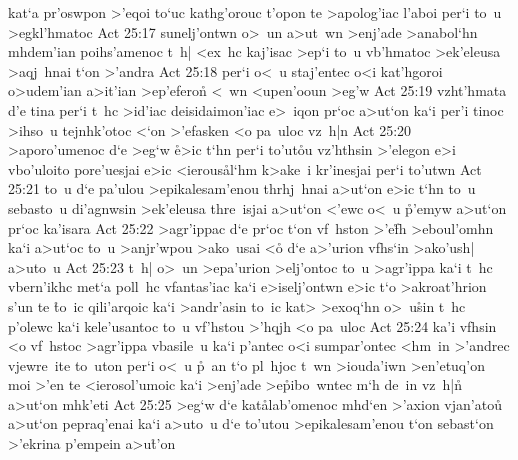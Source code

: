 kat`a
pr'oswpon
>'eqoi
to`uc
kathg'orouc
t'opon
te
>apolog'iac
l'aboi
per`i
to~u
>egkl'hmatoc\bibvsend
\vs Act 25:17
sunelj'ontwn
o>~un
a>ut~wn
>enj'ade
>anabol`hn
mhdem'ian
poihs'amenoc
t~h|
<ex~hc
kaj'isac
>ep`i
to~u
vb'hmatoc
>ek'eleusa
>aqj~hnai
t`on
>'andra\bibvsend
\vs Act 25:18
per`i
o<~u
staj'entec
o<i
kat'hgoroi
o>udem'ian
a>it'ian
>ep'eferon\r{}
<~wn
<upen'ooun
>eg'w\bibvsend
\vs Act 25:19
vzht'hmata
d'e
tina
per`i
t~hc
>id'iac
deisidaimon'iac
e>~iqon
pr`oc
a>ut`on
ka`i
per'i
tinoc
>ihso~u
tejnhk'otoc
<`on
>'efasken
<o
pa~uloc
vz~h|n\bibvsend
\vs Act 25:20
>aporo'umenoc
d`e
>eg`w
\r{e}>ic
t`hn
per`i
to'ut\r{o}u
vz'hthsin
>'elegon
e>i
vbo'uloito
pore'uesjai
e>ic
<ierous\r{a}l`hm
k>ake~i
kr'inesjai
per`i
to'utwn\bibvsend
\vs Act 25:21
to~u
d`e
pa'ulou
>epikalesam'enou
thrhj~hnai
a>ut`on
e>ic
t`hn
to~u
sebasto~u
di'agnwsin
>ek'eleusa
thre~isjai
a>ut`on
<'ewc
o<~u
\r{p}'emyw
a>ut`on
pr`oc
ka'isara\bibvsend
\vs Act 25:22
>agr'ippac
d`e
pr`oc
t`on
vf~hston
>'e\r{f}h
>eboul'omhn
ka`i
a>ut`oc
to~u
>anjr'wpou
>ako~usai
<o\r{}
d`e
a>'urion
vfhs`in
>ako'ush|
a>uto~u\bibvsend
\vs Act 25:23
t~h|
o>~un
>epa'urion
>elj'ontoc
to~u
>agr'ippa
ka`i
t~hc
vbern'ikhc
met`a
poll~hc
vfantas'iac
ka`i
e>iselj'ontwn
e>ic
t`o
>akroat'hrion
s'un
te
\r{t}o~ic
qili'arqoic
ka`i
>andr'asin
to~ic
kat>
>exoq`hn
o>~u\r{s}in
t~hc
p'olewc
ka`i
kele'usantoc
to~u
vf'hstou
>'hqjh
<o
pa~uloc\bibvsend
\vs Act 25:24
ka'i
vfhsin
<o
vf~hstoc
>agr'ippa
vbasile~u
ka`i
p'antec
o<i
sumpar'ontec
<hm~in
>'andrec
vjewre~ite
to~uton
per`i
o<~u
\r{p}~an
t`o
pl~hjoc
t~wn
>iouda'iwn
>en'etuq'on
moi
>'en
te
<ierosol'umoic
ka`i
>enj'ade
>e\r{p}ibo~wntec
m`h
de~in
vz~h|n\r{}
a>ut`on
mhk'eti\bibvsend
\vs Act 25:25
>eg`w
d`e
kat\r{a}lab'omenoc
mhd`en
>'axion
vjan'atou\r{}
a>ut`on
pepraq'enai
ka`i
a>uto~u
d`e
to'utou
>epikalesam'enou
t`on
sebast`on
>'ekrina
p'empein
a>u\r{t}'on\bibvsend
{}
